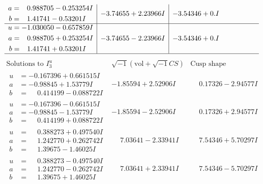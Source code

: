\documentclass[1p]{elsarticle_modified}
\theoremstyle{definition}
\newcommand{\I}{\sqrt{-1}}
\begin{document}
$$\begin{array}{c|c|c}
\begin{aligned}
a &= \phantom{-}0.988705 - 0.253254 I \\
b &= \phantom{-}1.41741 - 0.53201 I\end{aligned}
 & -3.74655 + 2.23966 I & -3.54346 + 0. I\phantom{ +0.000000I} \\ \hline\begin{aligned}
u &= -1.030050 - 0.657859 I \\
a &= \phantom{-}0.988705 + 0.253254 I \\
b &= \phantom{-}1.41741 + 0.53201 I\end{aligned}
 & -3.74655 - 2.23966 I & -3.54346 + 0. I\phantom{ +0.000000I}\\
 \hline 
 \end{array}$$\newpage$$\begin{array}{c|c|c}  
\text{Solutions to }I^u_{3}& \I (\text{vol} + \sqrt{-1}CS) & \text{Cusp shape}\\
 \hline 
\begin{aligned}
u &= -0.167396 + 0.661515 I \\
a &= -0.98845 + 1.53779 I \\
b &= \phantom{-}0.414199 - 0.088722 I\end{aligned}
 & -1.85594 + 2.52906 I & \phantom{-}0.17326 - 2.94577 I \\ \hline\begin{aligned}
u &= -0.167396 - 0.661515 I \\
a &= -0.98845 - 1.53779 I \\
b &= \phantom{-}0.414199 + 0.088722 I\end{aligned}
 & -1.85594 - 2.52906 I & \phantom{-}0.17326 + 2.94577 I \\ \hline\begin{aligned}
u &= \phantom{-}0.388273 + 0.497540 I \\
a &= \phantom{-}1.242770 + 0.262742 I \\
b &= \phantom{-}1.39675 - 1.46025 I\end{aligned}
 & \phantom{-}7.03641 - 2.33941 I & \phantom{-}7.54346 + 5.70297 I \\ \hline\begin{aligned}
u &= \phantom{-}0.388273 - 0.497540 I \\
a &= \phantom{-}1.242770 - 0.262742 I \\
b &= \phantom{-}1.39675 + 1.46025 I\end{aligned}
 & \phantom{-}7.03641 + 2.33941 I & \phantom{-}7.54346 - 5.70297 I \\ \hline\begin{aligned}

\end{aligned}
\end{array}$$
\end{document}

